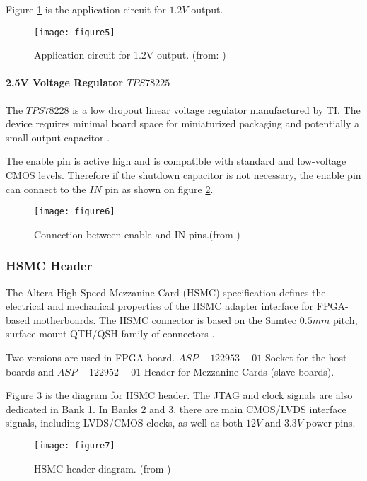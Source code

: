 Figure \ref{fig:b2_f5} is the application circuit for $1.2V$ output.

\begin{figure}
 \centering
 \texttt{[image: figure5]}
 \caption{Application circuit for 1.2V output. (from: \citep{TMicro:2012:LD1117xx})}
 \label{fig:b2_f5}
\end{figure}



\paragraph{2.5V Voltage Regulator \texorpdfstring{$TPS78225$}{TPS78225}}
The $TPS78228$ is a low dropout linear voltage regulator manufactured by TI.
The device requires minimal board space for miniaturized packaging and potentially a small output capacitor \citep{TI:2008:TPS782}.

The enable pin is active high and is compatible with standard and low-voltage CMOS levels. Therefore if the shutdown capacitor is not necessary, the enable pin can connect to the $IN$ pin as shown on figure \ref{fig:b2_f6}.

\begin{figure}
 \centering
 \texttt{[image: figure6]}
 \caption{Connection between enable and IN pins.(from \citep{TI:2008:TPS782})}
 \label{fig:b2_f6}
\end{figure}


\subsubsection{HSMC Header}
The Altera High Speed Mezzanine Card (HSMC) specification defines the electrical
and mechanical properties of the HSMC adapter interface for FPGA-based motherboards.
The HSMC connector is based on the Samtec $0.5mm$ pitch, surface-mount QTH/QSH family of connectors \citep{Altera:2009:HSMCspec}.

Two versions are used in FPGA board. $ASP-122953-01$ Socket for the host boards and $ASP-122952-01$ Header for Mezzanine Cards (slave boards).

Figure \ref{fig:b2_f7} is the diagram for HSMC header.
The JTAG and clock signals are also dedicated in Bank 1. In Banks 2 and 3, there are main CMOS/LVDS interface signals, including LVDS/CMOS clocks, as well as both $12V$ and $3.3V$ power pins.

\begin{figure}
 \centering
 \texttt{[image: figure7]}
 \caption{HSMC header diagram. (from \citep{Altera:2009:HSMCspec})}
 \label{fig:b2_f7}
\end{figure}

